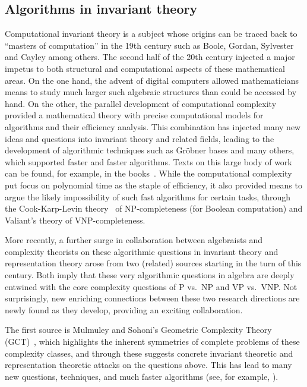 \documentclass[10pt,a4paper]{article}
\theoremstyle{definition}
\numberwithin{equation}{section}
\begin{document}
%
\subsection{Algorithms in invariant theory}\label{subsec:alg inv th}
%
%
%
%
%
%
%
%
%
%
%

Computational invariant theory is a subject whose origins can be traced back to
``masters of computation'' in the 19th century such as Boole, Gordan, Sylvester and Cayley among others.
The second half of the 20th century injected a major impetus to both structural and  computational aspects of these mathematical areas.
On the one hand, the advent of digital computers allowed mathematicians means to study much larger such algebraic structures than could be accessed by hand.
On the other, the parallel development of computational complexity provided a mathematical theory with precise computational models for algorithms and
their efficiency analysis.
This combination has injected many new ideas and questions into invariant theory and related fields, leading to the development of algorithmic techniques
such as Gr\"obner bases and many others, which supported faster and faster algorithms.
Texts on this large body of work can be found, for example, in the books~\cite{DK,Sturmfels,Cox-Little-Oshea}.
While the computational complexity put focus on polynomial time as the staple of efficiency, it also provided means to argue
the likely impossibility of such fast algorithms for certain tasks, through the Cook-Karp-Levin theory~\cite{cook:71,karp:72,levin:73}
of NP-completeness (for Boolean computation) and Valiant's theory of VNP-completeness.

More recently, a further surge in collaboration between algebraists and complexity theorists on these algorithmic questions in invariant theory
and representation theory arose from two (related) sources starting in the turn of this century.
Both imply that these very algorithmic questions in algebra are deeply entwined with the core complexity questions of P vs.~NP  and VP vs.~VNP.
Not surprisingly, new enriching connections between these two research directions are newly found as they develop, providing an exciting collaboration.

The first source is Mulmuley and Sohoni's Geometric Complexity Theory (GCT)~\cite{mulmuley2001geometric}, which highlights
the inherent symmetries of complete problems of these complexity classes, and through these suggests concrete invariant theoretic and
representation theoretic attacks on the questions above.
This has lead to many new questions, techniques, and much faster algorithms (see, for example, \cite{GCTV,FS,BCMW:17,MW19}).
\end{document}

